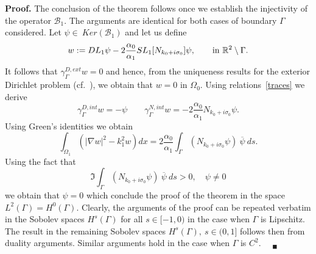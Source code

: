 \documentclass[11pt]{article}
\numberwithin{equation}{section}
\newenvironment{proof}{\hspace{0.5cm} {\bf Proof.}}
{$\quad {}_\blacksquare$\vspace{0.3cm}}
\begin{document}
\begin{proof}
  The conclusion of the theorem follows once we establish the injectivity of the operator $\mathcal{B}_1$. The arguments are identical for both cases of boundary $\Gamma$ considered. Let $\psi\in\ Ker(\mathcal{B}_1)$ and let us define
  \[
  w:=DL_1\psi-2\frac{\alpha_0}{\alpha_1}SL_1[N_{k_0+i\sigma_0}]\psi,\qquad {\rm in}\ \mathbb{R}^2\setminus\Gamma.
  \]
  It follows that $\gamma_\Gamma^{D,ext}w=0$ and hence, from the uniqueness results for the exterior Dirichlet problem (cf.~\cite[Theorem 3.21]{KressColton}),  we obtain that  $w=0$ in $\Omega_0$. Using relations~\eqref{traces} we derive
  \[
  \gamma_\Gamma^{D,int}w=-\psi\qquad \gamma_\Gamma^{N,int}w=-2\frac{\alpha_0}{\alpha_1}N_{k_0+i\sigma_0}\psi.
  \]
  Using Green's identities we obtain
  \[
  \int_{\Omega_1}(|\nabla w|^2-k_1^2 w)dx = 2\frac{\alpha_0}{\alpha_1}\int_\Gamma (N_{k_0+i\sigma_0}\psi)\ \overline{\psi}\ ds.
  \]
  Using the fact that~\cite{turc2}
  \[
  \Im\int_\Gamma (N_{k_0+i\sigma_0}\psi)\ \overline{\psi}\ ds>0,\quad \psi\neq 0
  \]
  we obtain that $\psi=0$ which conclude the proof of the theorem in the space $L^2(\Gamma)=H^0(\Gamma)$. Clearly, the arguments of the proof can be repeated verbatim in the Sobolev spaces $H^s(\Gamma)$ for all $s\in[-1,0)$ in the case when $\Gamma$ is Lipschitz. The result in the remaining Sobolev spaces $H^s(\Gamma),\ s\in(0,1]$ follows then from duality arguments. Similar arguments hold in the case when $\Gamma$ is $C^2$.
\end{proof}
\end{document}
